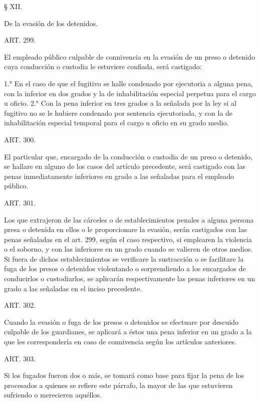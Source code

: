     § XII.

    De la evasión de los detenidos.





    ART. 299.

    El empleado público culpable de connivencia en la evasión de un preso o detenido cuya conducción o custodia le estuviere confiada, será castigado:

    1.° En el caso de que el fugitivo se halle condenado por ejecutoria a alguna pena, con la inferior en dos grados y la de inhabilitación especial perpetua para el cargo u oficio.
    2.° Con la pena inferior en tres grados a la señalada por la ley si al fugitivo no se le hubiere condenado por sentencia ejecutoriada, y con la de inhabilitación especial temporal para el cargo u oficio en su grado medio.

    ART. 300.

    El particular que, encargado de la conducción o custodia de un preso o detenido, se hallare en alguno de los casos del artículo precedente, será castigado con las penas inmediatamente inferiores en grado a las señaladas para el empleado público.


    ART. 301.

    Los que extrajeron de las cárceles o de establecimientos penales a alguna persona presa o detenida en ellos o le proporcionare la evasión, serán castigados con las penas señaladas en el art. 299, según el caso respectivo, si emplearen la violencia o el soborno, y con las inferiores en un grado cuando se valieren de otros medios.
    Si fuera de dichos establecimientos se verificare la sustracción o se facilitare la fuga de los presos o detenidos violentando o sorprendiendo a los encargados de conducirlos o custodiarlos, se aplicarán respectivamente las penas inferiores en un grado a las señaladas en el inciso precedente.


    ART. 302.

    Cuando la evasión o fuga de los presos o detenidos se efectuare por descuido culpable de los guardianes, se aplicará a éstos una pena inferior en un grado a la que les correspondería en caso de connivencia según los artículos anteriores.



    ART. 303.

    Si los fugados fueron dos o más, se tomará como base para fijar la pena de los procesados a quienes se refiere este párrafo, la mayor de las que estuvieren sufriendo o merecieren aquéllos.



